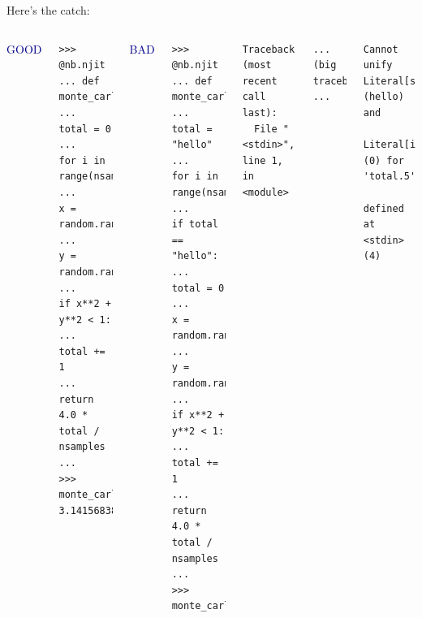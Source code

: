 \documentclass[aspectratio=169]{beamer}
\begin{document}
\begin{frame}[fragile]{Here's the catch: }
\vspace{-0.6 cm}
\begin{columns}[t]
\Large
\begin{center}
\textcolor{darkblue}{GOOD}
\end{center}

\vspace{-0.3 cm}
\scriptsize
\begin{verbatim}
>>> @nb.njit
... def monte_carlo_pi(nsamples):
...     total = 0
...     for i in range(nsamples):
...         x = random.random()
...         y = random.random()
...         if x**2 + y**2 < 1:
...             total += 1
...     return 4.0 * total / nsamples
... 
>>> monte_carlo_pi(int(1e9))
3.14156838
\end{verbatim}

\Large
\begin{center}
\textcolor{darkblue}{BAD}
\end{center}

\vspace{-0.3 cm}
\scriptsize
\begin{verbatim}
>>> @nb.njit
... def monte_carlo_pi(nsamples):
...     total = "hello"
...     for i in range(nsamples):
...         if total == "hello":
...             total = 0
...         x = random.random()
...         y = random.random()
...         if x**2 + y**2 < 1:
...             total += 1
...     return 4.0 * total / nsamples
... 
>>> monte_carlo_pi(int(1e9))
\end{verbatim}
\vspace{-0.3 cm}
\begin{verbatim}
Traceback (most recent call last):
  File "<stdin>", line 1, in <module>
\end{verbatim}
\vspace{-0.5 cm}
\begin{verbatim}
... (big traceback) ...
\end{verbatim}
\vspace{-0.5 cm}
\begin{verbatim}
Cannot unify Literal[str](hello) and
    Literal[int](0) for 'total.5',
    defined at <stdin> (4)
\end{verbatim}
\vspace{0.5 cm}
\end{columns}
\end{frame}
\end{document}
